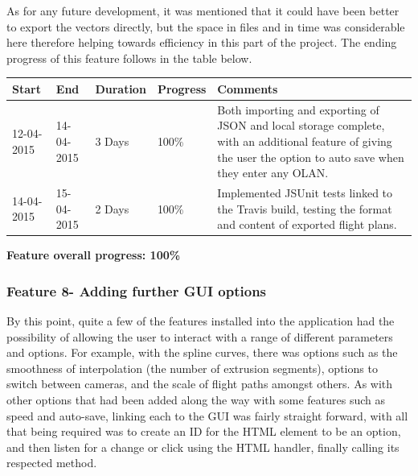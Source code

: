 As for any future development, it was mentioned that it could have been better to export the vectors directly, but the space in files and in time was considerable here therefore helping towards efficiency in this part of the project. The ending progress of this feature follows in the table below.

\begin{table}[h]
\begin{tabular}{|l|l|l|l|p{7cm}|}
\hline
\textbf{Start} & \textbf{End} & \textbf{Duration} & \textbf{Progress} & \textbf{Comments}                                                                                                     \\ \hline
12-04-2015     & 14-04-2015   & 3 Days            & 100\%             &  Both importing and exporting of JSON and local storage complete, with an additional feature of giving the user the option to auto save when they enter any OLAN.\\ \hline
14-04-2015     & 15-04-2015   & 2 Days            & 100\%             &  Implemented JSUnit tests linked to the Travis build, testing the format and content of exported flight plans.\\ \hline
\end{tabular}
\end{table}

\textbf{Feature overall progress: 100\%}

\subsubsection{Feature 8- Adding further GUI options}
By this point, quite a few of the features installed into the application had the possibility of allowing the user to interact with a range of different parameters and options. For example, with the spline curves, there was options such as the smoothness of interpolation (the number of extrusion segments), options to switch between cameras, and the scale of flight paths amongst others. As with other options that had been added along the way with some features such as speed and auto-save, linking each to the GUI was fairly straight forward, with all that being required was to create an ID for the HTML element to be an option, and then listen for a change or click using the HTML handler, finally calling its respected method.  

